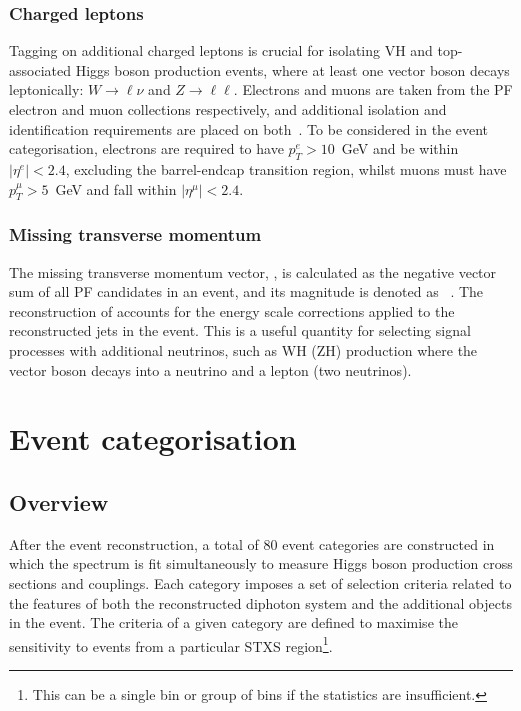\subsubsection{Charged leptons}
Tagging on additional charged leptons is crucial for isolating VH and top-associated Higgs boson production events, where at least one vector boson decays leptonically: $W\rightarrow\ell\nu$ and $Z\rightarrow\ell\ell$. Electrons and muons are taken from the PF electron and muon collections respectively, and additional isolation and identification requirements are placed on both~\cite{Khachatryan:2015hwa,Sirunyan:2018fpa}. To be considered in the event categorisation, electrons are required to have $p_T^e>10$~GeV and be within $|\eta^e|<2.4$, excluding the barrel-endcap transition region, whilst muons must have $p_T^\mu>5$~GeV and fall within $|\eta^\mu|<2.4$.

\subsubsection{Missing transverse momentum}
The missing transverse momentum vector, \metv, is calculated as the negative vector \pt sum of all PF candidates in an event, and its magnitude is denoted as \met~\cite{Sirunyan:2019kia}. The reconstruction of \metv accounts for the energy scale corrections applied to the reconstructed jets in the event. This is a useful quantity for selecting signal processes with additional neutrinos, such as WH (ZH) production where the vector boson decays into a neutrino and a lepton (two neutrinos).

\section{Event categorisation}\label{sec:event_categorisation}

\subsection{Overview}
After the event reconstruction, a total of 80 event categories are constructed in which the \mgg spectrum is fit simultaneously to measure Higgs boson production cross sections and couplings. Each category imposes a set of selection criteria related to the features of both the reconstructed diphoton system and the additional objects in the event. The criteria of a given category are defined to maximise the sensitivity to events from a particular STXS region\footnote{This can be a single bin or group of bins if the statistics are insufficient.}.

